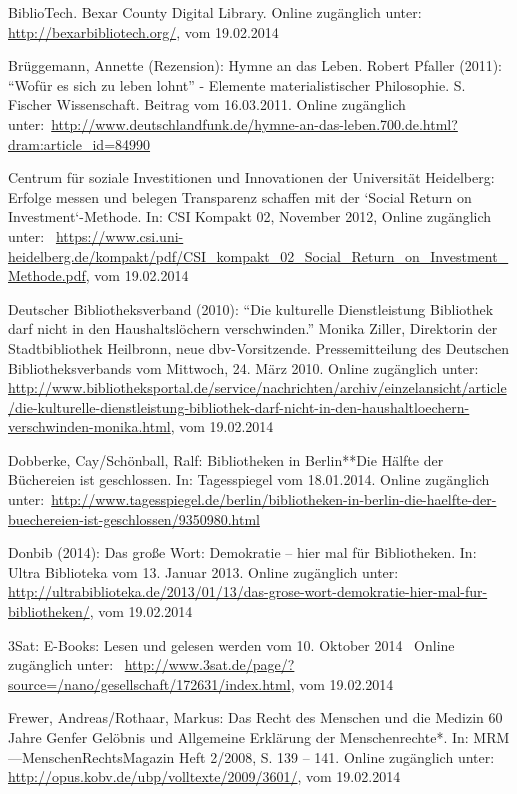 \documentclass[a4paper,
fontsize=11pt,
oneside,
numbers=noperiodatend,
parskip=half-,
bibliography=totoc,
final
]{scrartcl}
\begin{document}
BiblioTech. Bexar County Digital Library. Online zugänglich unter:~
\url{http://bexarbibliotech.org/}, vom 19.02.2014~

Brüggemann, Annette (Rezension): Hymne an das Leben. Robert Pfaller
(2011): \enquote{Wofür es sich zu leben lohnt} - Elemente
materialistischer Philosophie. S. Fischer Wissenschaft. Beitrag vom
16.03.2011. Online zugänglich
unter:~\url{http://www.deutschlandfunk.de/hymne-an-das-leben.700.de.html?dram:article_id=84990}

Centrum für soziale Investitionen und Innovationen der Universität
Heidelberg: Erfolge messen und belegen Transparenz schaffen mit der
`Social Return on Investment`-Methode. In: CSI Kompakt 02, November
2012, Online zugänglich unter:~
\url{https://www.csi.uni-heidelberg.de/kompakt/pdf/CSI_kompakt_02_Social_Return_on_Investment_Methode.pdf},
vom 19.02.2014

Deutscher Bibliotheksverband (2010): \enquote{Die kulturelle
Dienstleistung Bibliothek darf nicht in den Haushaltslöchern
verschwinden.} Monika Ziller, Direktorin der Stadtbibliothek Heilbronn,
neue dbv-Vorsitzende. Pressemitteilung des Deutschen Bibliotheksverbands
vom Mittwoch, 24. März 2010. Online zugänglich unter:~
\url{http://www.bibliotheksportal.de/service/nachrichten/archiv/einzelansicht/article/die-kulturelle-dienstleistung-bibliothek-darf-nicht-in-den-haushaltloechern-verschwinden-monika.html},
vom 19.02.2014

Dobberke, Cay/Schönball, Ralf: Bibliotheken in Berlin**Die Hälfte der
Büchereien ist geschlossen. In: Tagesspiegel vom 18.01.2014. Online
zugänglich
unter:~\url{http://www.tagesspiegel.de/berlin/bibliotheken-in-berlin-die-haelfte-der-buechereien-ist-geschlossen/9350980.html}

Donbib (2014): Das große Wort: Demokratie -- hier mal für Bibliotheken.
In: Ultra Biblioteka vom 13. Januar 2013. Online zugänglich unter:~
\url{http://ultrabiblioteka.de/2013/01/13/das-grose-wort-demokratie-hier-mal-fur-bibliotheken/},
vom 19.02.2014

3Sat: E-Books: Lesen und gelesen werden vom 10. Oktober 2014~ Online
zugänglich unter:~
\url{http://www.3sat.de/page/?source=/nano/gesellschaft/172631/index.html},
vom 19.02.2014

Frewer, Andreas/Rothaar, Markus: Das Recht des Menschen und die Medizin
60 Jahre Genfer Gelöbnis und Allgemeine Erklärung der Menschenrechte*.
In: MRM ---MenschenRechtsMagazin Heft 2/2008, S. 139 -- 141. Online
zugänglich unter:~ \url{http://opus.kobv.de/ubp/volltexte/2009/3601/},
vom 19.02.2014
\end{document}
